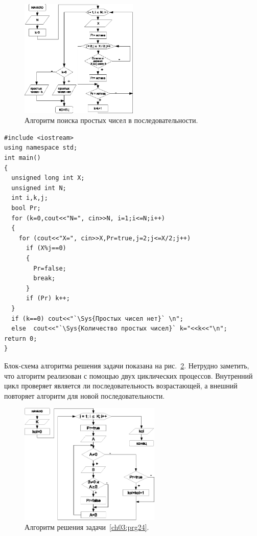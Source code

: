 \begin{figure}[htb]
\begin{center}
\includegraphics[width=0.5\textwidth]{img/ris_3_37}
\caption{Алгоритм поиска простых чисел в последовательности.}
\label{ch03:refDrawing36}
\end{center}
\end{figure}

\begin{lstlisting}
#include <iostream>
using namespace std;
int main()
{
  unsigned long int X; 
  unsigned int N; 
  int i,k,j;
  bool Pr;
  for (k=0,cout<<"N=", cin>>N, i=1;i<=N;i++)
  {
    for (cout<<"X=", cin>>X,Pr=true,j=2;j<=X/2;j++)
      if (X%j==0) 
      {
        Pr=false;
        break;
      }
      if (Pr) k++;
  }
  if (k==0) cout<<"`\Sys{Простых чисел нет}` \n";
  else  cout<<"`\Sys{Количество простых чисел}` k="<<k<<"\n";
return 0;
}
\end{lstlisting}


Блок-схема алгоритма решения задачи показана на рис.~\ref{ch03:refDrawing37}. Нетрудно заметить, что алгоритм реализован с
помощью двух циклических процессов. Внутренний цикл проверяет является ли последовательность возрастающей, а внешний
повторяет алгоритм для новой последовательности.

\begin{figure}[htb]
\begin{center}
\includegraphics[width=0.6\textwidth]{img/ris_3_38}
\caption{Алгоритм решения задачи~\ref{ch03:prg24}.}
\label{ch03:refDrawing37}
\end{center}
\end{figure}

